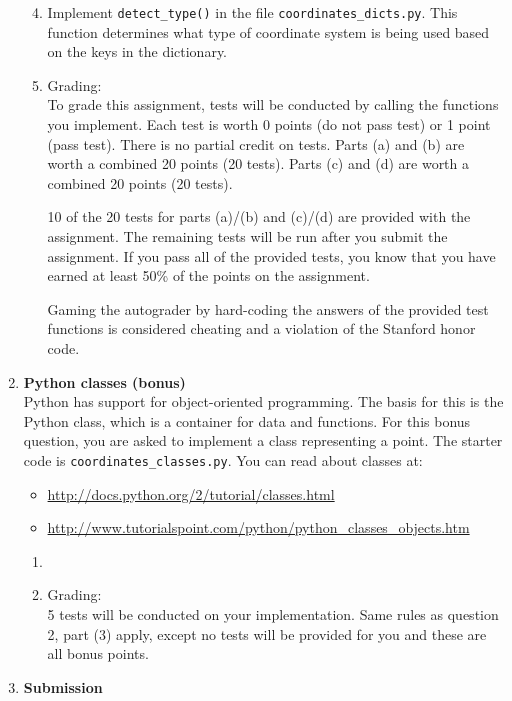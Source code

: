\documentclass{article}
\newcounter{points}
\newcommand\printpoints{Total number of points: \thepoints}
\begin{document}
\begin{enumerate}
\begin{enumerate}
\setcounter{enumii}{3}
\item Implement \texttt{detect\_type()} in the file \texttt{coordinates\_dicts.py}.  This function determines what type of coordinate system is being used based on the keys in the dictionary.
\end{enumerate}

\begin{enumerate}
\setcounter{enumii}{4}
\item Grading: \\

To grade this assignment, tests will be conducted by calling the functions you implement.  Each test is worth 0 points (do not pass test) or 1 point (pass test).  There is no partial credit on tests.  Parts (a) and (b) are worth a combined 20 points (20 tests).  Parts (c) and (d) are worth a combined 20 points (20 tests).

10 of the 20 tests for parts (a)/(b) and (c)/(d) are provided with the assignment.  The remaining tests will be run after you submit the assignment.  If you pass all of the provided tests, you know that you have earned at least 50\% of the points on the assignment.

Gaming the autograder by hard-coding the answers of the provided test functions is considered cheating and a violation of the Stanford honor code.
\end{enumerate}


\item \textbf{Python classes (bonus)} \\
Python has support for object-oriented programming.  The basis for this is the Python class, which is a container for data and functions.  For this bonus question, you are asked to implement a class representing a point.  The starter code is \texttt{coordinates\_classes.py}.  You can read about classes at:

\begin{itemize}
\item \url{http://docs.python.org/2/tutorial/classes.html}
\item \url{http://www.tutorialspoint.com/python/python_classes_objects.htm}
\end{itemize}

\begin{enumerate}
\item 
\end{enumerate}

\begin{enumerate}
\setcounter{enumii}{1}
\item Grading: \\

5 tests will be conducted on your implementation.  Same rules as question 2, part (3) apply, except no tests will be provided for you and these are all bonus points.  
\end{enumerate}

\item \textbf{Submission} \\



\end{enumerate}
\end{document}
